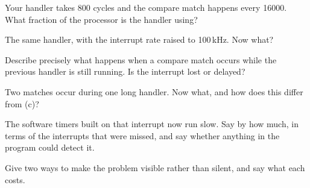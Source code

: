 \label{c5:ex:slow}
\begin{parts}
  \item Your handler takes 800 cycles and the compare match happens every 16000. What fraction of
    the processor is the handler using?
  \item The same handler, with the interrupt rate raised to 100\,kHz. Now what?
  \item Describe precisely what happens when a compare match occurs while the previous handler is
    still running. Is the interrupt lost or delayed?
  \item Two matches occur during one long handler. Now what, and how does this differ from (c)?
  \item The software timers built on that interrupt now run slow. Say by how much, in terms of the
    interrupts that were missed, and say whether anything in the program could detect it.
  \item Give two ways to make the problem visible rather than silent, and say what each costs.
\end{parts}
